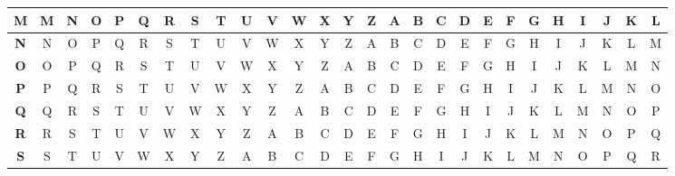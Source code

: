 \begin{table}[H]
\begin{tabular}{|c||c|c|c|c|c|c|c|c|c|c|c|c|c|c|c|c|c|c|c|c|c|c|c|c|c|c|}
						\textbf{M} & M          & N          & O          & P          & Q          & R          & S          & T          & U          & V          & W          & X          & Y          & Z          & A          & B          & C          & D          & E          & F          & G          & H          & I          & J          & K          & L          \\ \hline
						\textbf{N} & N          & O          & P          & Q          & R          & S          & T          & U          & V          & W          & X          & Y          & Z          & A          & B          & C          & D          & E          & F          & G          & H          & I          & J          & K          & L          & M          \\ \hline
						\textbf{O} & O          & P          & Q          & R          & S          & T          & U          & V          & W          & X          & Y          & Z          & A          & B          & C          & D          & E          & F          & G          & H          & I          & J          & K          & L          & M          & N          \\ \hline
						\textbf{P} & P          & Q          & R          & S          & T          & U          & V          & W          & X          & Y          & Z          & A          & B          & C          & D          & E          & F          & G          & H          & I          & J          & K          & L          & M          & N          & O          \\ \hline
						\textbf{Q} & Q          & R          & S          & T          & U          & V          & W          & X          & Y          & Z          & A          & B          & C          & D          & E          & F          & G          & H          & I          & J          & K          & L          & M          & N          & O          & P          \\ \hline
						\textbf{R} & R          & S          & T          & U          & V          & W          & X          & Y          & Z          & A          & B          & C          & D          & E          & F          & G          & H          & I          & J          & K          & L          & M          & N          & O          & P          & Q          \\ \hline
						\textbf{S} & S          & T          & U          & V          & W          & X          & Y          & Z          & A          & B          & C          & D          & E          & F          & G          & H          & I          & J          & K          & L          & M          & N          & O          & P          & Q          & R          \\ \hline

\end{tabular}
\end{table}
